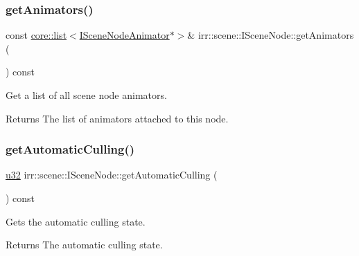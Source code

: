 \subsubsection{\texorpdfstring{get\+Animators()}{getAnimators()}}
{\footnotesize\ttfamily const \hyperlink{classirr_1_1core_1_1list}{core\+::list}$<$\hyperlink{classirr_1_1scene_1_1ISceneNodeAnimator}{I\+Scene\+Node\+Animator}$\ast$$>$\& irr\+::scene\+::\+I\+Scene\+Node\+::get\+Animators (\begin{DoxyParamCaption}{ }\end{DoxyParamCaption}) const\hspace{0.3cm}{\ttfamily [inline]}}



Get a list of all scene node animators. 

\begin{DoxyReturn}{Returns}
The list of animators attached to this node. 
\end{DoxyReturn}
\mbox{\label{classirr_1_1scene_1_1ISceneNode_a0748cd5c678e41a4fcff0514937c77be}} 
\subsubsection{\texorpdfstring{get\+Automatic\+Culling()}{getAutomaticCulling()}}
{\footnotesize\ttfamily \hyperlink{namespaceirr_a0416a53257075833e7002efd0a18e804}{u32} irr\+::scene\+::\+I\+Scene\+Node\+::get\+Automatic\+Culling (\begin{DoxyParamCaption}{ }\end{DoxyParamCaption}) const\hspace{0.3cm}{\ttfamily [inline]}}



Gets the automatic culling state. 

\begin{DoxyReturn}{Returns}
The automatic culling state. 
\end{DoxyReturn}
\mbox{\label{classirr_1_1scene_1_1ISceneNode_a223f718fc2f4944b5ad28c592f6cc8c6}} 
